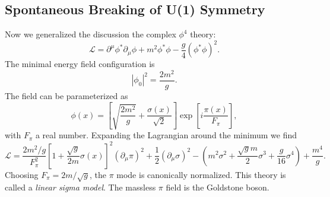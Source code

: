 \documentclass[aps,prb,superscriptaddress,nofootinbib]{revtex4}
\begin{document}
\subsection{Spontaneous Breaking of U(1) Symmetry}
Now we generalized the discussion the complex $\phi^4$ theory:
\begin{equation}
	\mathcal L = \partial^\mu \phi^* \partial_\mu \phi + m^2\phi^* \phi - \frac{g}{4}(\phi^*\phi)^2.
\end{equation}
The minimal energy field configuration is 
\begin{equation}
	|\phi_0|^2 = \frac{2m^2}{g}.
\end{equation}
The field can be parameterized as
\begin{equation}
	\phi(x)=\left[\sqrt{\frac{2 m^{2}}{g}}+\frac{\sigma(x)}{\sqrt{2}} \right] \exp\left[{i \frac{\pi(x)}{F_{\pi}}}\right],
\end{equation}
with $F_{\pi}$ a real number. 
Expanding the Lagrangian around the minimum we find
\begin{equation}
	\mathcal{L}= \frac{2m^2/g}{F_\pi^2} \left[1+\frac{\sqrt{g}}{2m} \sigma(x) \right]^{2} \left(\partial_{\mu} \pi\right)^{2} +\frac{1}{2}\left(\partial_{\mu} \sigma\right)^{2}
	-\left(m^{2} \sigma^{2}+\frac{\sqrt{g} m}{2} \sigma^{3}+\frac{g}{16} \sigma^{4}\right)+\frac{m^{4}}{g}.
\end{equation}
Choosing $F_\pi = 2m/\sqrt{g}$, the $\pi$ mode is canonically normalized.
This theory is called a \textit{linear sigma model}.
The massless $\pi$ field is the Goldstone boson.
\end{document}

